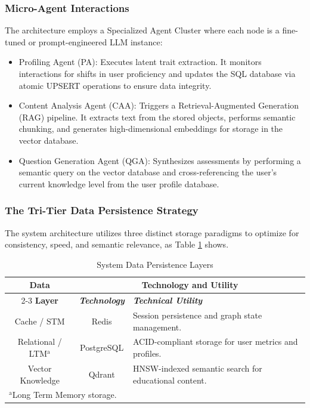 \documentclass[conference]{IEEEtran}
\begin{document}
\subsubsection{Micro-Agent Interactions}
The architecture employs a Specialized Agent Cluster where each node is a fine-tuned or prompt-engineered LLM instance:
\begin{itemize}
	\item Profiling Agent (PA): Executes latent trait extraction. It monitors interactions for shifts in user proficiency and updates the SQL database via atomic UPSERT operations to ensure data integrity.
	\item Content Analysis Agent (CAA): Triggers a Retrieval-Augmented Generation (RAG) pipeline. It extracts text from the stored objects, performs semantic chunking, and generates high-dimensional embeddings for storage in the vector database.
	\item Question Generation Agent (QGA): Synthesizes assessments by performing a semantic query on the vector database and cross-referencing the user's current knowledge level from the user profile database.
\end{itemize}

\subsubsection{The Tri-Tier Data Persistence Strategy}
The system architecture utilizes three distinct storage paradigms to optimize for consistency, speed, and semantic relevance, as Table \ref{tab:persistence} shows.
\begin{table}[htbp]
	\caption{System Data Persistence Layers}
	\begin{center}
		\begin{tabular}{|c|c|p{4cm}|}
			\hline
			\textbf{Data}&\multicolumn{2}{|c|}{\textbf{Technology and Utility}} \\
			\cline{2-3} 
			\textbf{Layer} & \textbf{\textit{Technology}}& \textbf{\textit{Technical Utility}} \\
			\hline
			Cache / STM & Redis & Session persistence and graph state management. \\
			\hline
			Relational / LTM$^{\mathrm{a}}$ & PostgreSQL & ACID-compliant storage for user metrics and profiles. \\
			\hline
			Vector Knowledge & Qdrant & HNSW-indexed semantic search for educational content. \\
			\hline
			\multicolumn{3}{l}{$^{\mathrm{a}}$Long Term Memory storage.}
		\end{tabular}
		\label{tab:persistence}
	\end{center}
\end{table}
\end{document}
